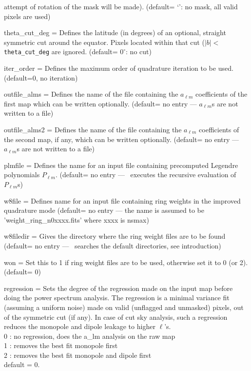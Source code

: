 \begin{qualifiers}
\begin{qulist}{}
attempt of rotation of the mask will be made).
(default= `': no mask, all valid pixels are used)
 \item[{theta\_cut\_deg = }] Defines the latitude (in degrees) of 
an optional, straight symmetric cut around the equator.  Pixels located within
that cut ($|b|<${\tt theta\_cut\_deg} are ignored.
(default= $0^\circ$: no cut)
 \item[{iter\_order = }] Defines the maximum order of quadrature 
iteration to be used. (default=0, no iteration)
 \item[{outfile\_alms = }] Defines the name of the file 
containing the $a_{\ell m}$  coefficients of the first map
which can be written optionally.   (default= no entry ---
$a_{\ell m}$s are not written to a file)
 \item[{outfile\_alms2 = }] Defines the name of the file 
containing the $a_{\ell m}$  coefficients of the second map, if any,
which can be written optionally.   (default= no entry ---
$a_{\ell m}$s are not written to a file)
 \item[{plmfile = }] Defines the name for an input file
    containing  precomputed Legendre polynomials $P_{\ell m}$.
(default= no entry --- \thedocid\ executes the recursive evaluation 
of $P_{\ell m}$s)
\item[{w8file = }] Defines name for an input file containing ring
  weights in the improved quadrature mode (default= no entry ---
the name is assumed to be 'weight\_ring\_n0xxxx.fits' where xxxx is nsmax)
\item[{w8filedir = }] Gives the directory where the ring weight files are
to be found (default= no entry --- \thedocid\ searches the default
directories, see introduction)
\item[{won = }] Set this to 1 if ring weight files are to be used,
otherwise set it to 0 (or 2). (default= 0)
\item[{regression = }] {{Sets the degree of the regression made on the
input map before doing the power spectrum analysis. 
The regression is a minimal variance fit (assuming a uniform noise) 
made on valid (unflagged and unmasked) pixels, out of the symmetric cut (if
any). In case of cut sky analysis, such a regression reduces the monopole
and dipole leakage to higher $\ell$'s.\\
0 : no regression, does the a\_lm analysis on the raw map\\
1 : removes the best fit monopole first\\
2 : removes the best fit monopole and dipole first\\
default = 0.}}
 
  \end{qulist}
\end{qualifiers}
\vfill

